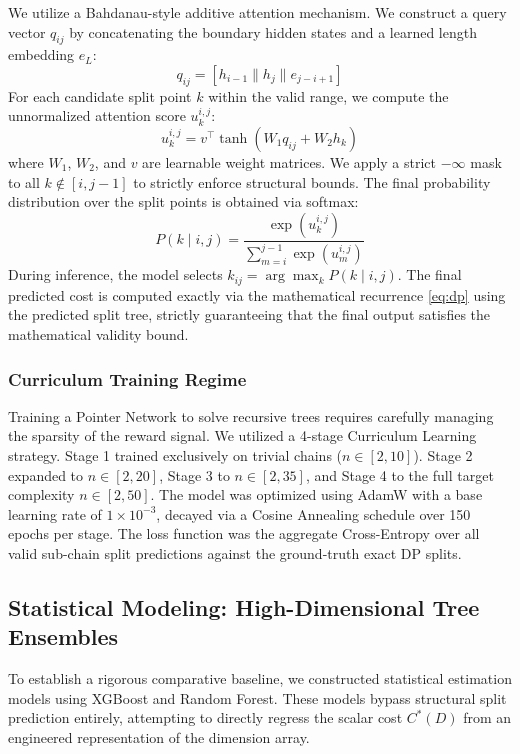 \documentclass[conference]{IEEEtran}
\begin{document}
We utilize a Bahdanau-style \cite{b9} additive attention mechanism. We construct a query vector $q_{ij}$ by concatenating the boundary hidden states and a learned length embedding $e_L$:
\begin{equation}
q_{ij} = [h_{i-1} \parallel h_j \parallel e_{j-i+1}]
\end{equation}
For each candidate split point $k$ within the valid range, we compute the unnormalized attention score $u_k^{i,j}$:
\begin{equation}
u_k^{i,j} = v^\top \tanh(W_1 q_{ij} + W_2 h_k)
\end{equation}
where $W_1$, $W_2$, and $v$ are learnable weight matrices. We apply a strict $-\infty$ mask to all $k \notin [i, j-1]$ to strictly enforce structural bounds. The final probability distribution over the split points is obtained via softmax:
\begin{equation}
P(k \mid i,j) = \frac{\exp(u_k^{i,j})}{\sum_{m=i}^{j-1} \exp(u_m^{i,j})}
\end{equation}
During inference, the model selects $\hat{k}_{ij} = \arg\max_k P(k \mid i,j)$. The final predicted cost is computed exactly via the mathematical recurrence \eqref{eq:dp} using the predicted split tree, strictly guaranteeing that the final output satisfies the mathematical validity bound.

\subsubsection{Curriculum Training Regime} 
Training a Pointer Network to solve recursive trees requires carefully managing the sparsity of the reward signal. We utilized a 4-stage Curriculum Learning strategy. Stage 1 trained exclusively on trivial chains ($n \in [2, 10]$). Stage 2 expanded to $n \in [2, 20]$, Stage 3 to $n \in [2, 35]$, and Stage 4 to the full target complexity $n \in [2, 50]$. The model was optimized using AdamW with a base learning rate of $1 \times 10^{-3}$, decayed via a Cosine Annealing schedule over 150 epochs per stage. The loss function was the aggregate Cross-Entropy over all valid sub-chain split predictions against the ground-truth exact DP splits.

\subsection{Statistical Modeling: High-Dimensional Tree Ensembles}
To establish a rigorous comparative baseline, we constructed statistical estimation models using XGBoost and Random Forest. These models bypass structural split prediction entirely, attempting to directly regress the scalar cost $C^*(D)$ from an engineered representation of the dimension array.
\end{document}
